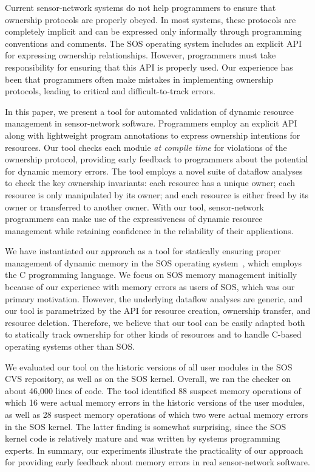 Current sensor-network systems do not help
programmers to ensure that ownership protocols are properly obeyed.
In most systems, these protocols are completely implicit and can
be expressed only informally through programming conventions and comments.
The SOS operating system includes an explicit API for expressing
ownership relationships.  However, programmers must take
responsibility for ensuring that this API is properly used.
Our experience has been that programmers often make
mistakes in implementing ownership protocols, leading to critical
and difficult-to-track errors.  %

In this paper, we present a tool for automated validation of dynamic
resource management in sensor-network software.
Programmers employ an explicit API along with
lightweight program annotations to express ownership intentions for
resources.
Our tool checks each module {\em at compile time} for violations of
the ownership protocol, providing early feedback
to programmers about the potential for dynamic memory errors.  The
tool employs a novel suite of dataflow analyses to check the key ownership
invariants:  each resource has a unique owner; each resource is only
manipulated by its owner; and each resource is either freed by its
owner or transferred to another owner.  %
With our tool, sensor-network programmers can make use of the
expressiveness of dynamic resource management 
while retaining confidence in the reliability of their applications.

We have instantiated our approach as a tool for statically ensuring
proper management of dynamic memory in the SOS operating
system~\cite{sos}, which employs the C programming language.
We focus on SOS memory management initially because of our experience
with memory errors as users of SOS, which was our primary motivation.  
However, the underlying dataflow analyses are generic, and
our tool is parametrized
by the API for resource creation, ownership transfer, and resource deletion.
Therefore, we believe that our tool can be easily adapted
both to statically track ownership for other kinds of resources and to
handle C-based operating systems other than SOS.

We evaluated our tool on the historic versions of all
user modules in the SOS CVS repository, as well as on the SOS kernel.
Overall, we ran the checker on about 46,000 lines of code.
The tool identified
88 suspect memory operations of which 16 were actual
memory errors in the historic
versions of the user modules, as well as 28 suspect memory operations of which 
two were actual memory errors in the SOS kernel.  
The latter finding is
somewhat surprising, since the SOS kernel code is relatively mature
and was written by systems programming experts.
In summary, our experiments illustrate the practicality of our
approach for providing early feedback about memory errors in
real sensor-network software.

